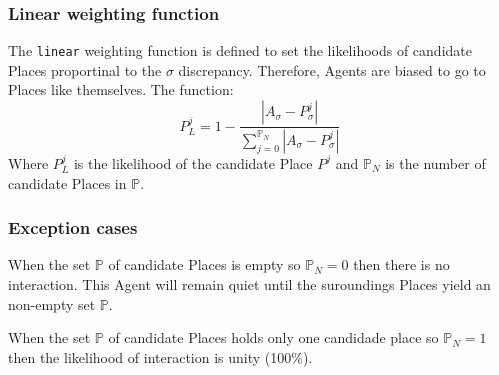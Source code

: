 \documentclass{article}
\begin{document}
\subsubsection{Linear weighting function}

\par The \texttt{linear} weighting function is defined to set the likelihoods of candidate Places proportinal to the $\sigma$ discrepancy. Therefore, Agents are biased to go to Places like themselves. The function:
\begin{equation}
     P^{j}_L = 1 - \frac{|A_{\sigma} - P^{j}_{\sigma}|}{\sum_{j=0}^{\mathbb{P}_N} |A_{\sigma} - P^{j}_{\sigma}|}
\end{equation}
Where $P^{j}_L$ is the likelihood of the candidate Place $P^{j}$ and ${\mathbb{P}_N}$ is the number of candidate Places in $\mathbb{P}$.

\subsubsection{Exception cases}

\par When the set $\mathbb{P}$ of candidate Places is empty so ${\mathbb{P}}_N = 0$ then there is no interaction. This Agent will remain quiet until the suroundings Places yield an non-empty set $\mathbb{P}$.

\par When the set $\mathbb{P}$ of candidate Places holds only one candidade place so ${\mathbb{P}}_N = 1$ then the likelihood of interaction is unity (100\%).
\end{document}
